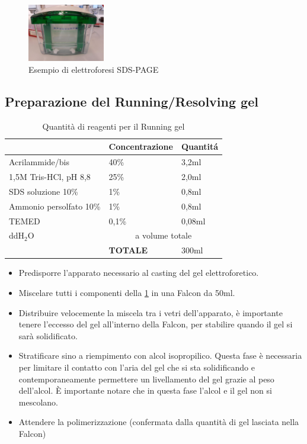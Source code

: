 \begin{figure}[H]
	\centering
	\includegraphics[width=0.3\textwidth]{./immagini/sds-page.jpg}
	\caption{Esempio di elettroforesi SDS-PAGE}
	\label{sds-page}
\end{figure}



\subsection{Preparazione del Running/Resolving gel}

\begin{table}
\begin{tabular}{|l|l|l|} \hline
	& \textbf{Concentrazione} & \textbf{Quantit\'a} \\\hline
	Acrilammide/bis & 40\% & 3,2ml \\\hline
	1,5M Tris-HCl, pH 8,8 & 25\% & 2,0ml \\\hline
	SDS soluzione 10\% & 1\% & 0,8ml \\\hline
	Ammonio persolfato 10\% & 1\% & 0,8ml \\\hline
	TEMED & 0,1\% & 0,08ml \\\hline
	ddH$_2$O & \multicolumn{2}{c|}{a volume totale} \\\hline

	& \textbf{TOTALE} & 300ml \\\hline
\end{tabular}
\caption{Quantit\`a di reagenti per il Running gel}
\label{table:running-gel}
\end{table}


\begin{itemize}
	\item Predisporre l'apparato necessario al casting del gel elettroforetico.

	\item Miscelare tutti i componenti della \ref{table:running-gel} in una Falcon da 50ml.

	\item Distribuire velocemente la miscela tra i vetri dell'apparato, \`e importante
	tenere l'eccesso del gel all'interno della Falcon, per stabilire quando il gel
	si sar\`a solidificato.

	\item Stratificare sino a riempimento con alcol isopropilico.
	Questa fase \`e necessaria per limitare il contatto con l'aria
	del gel che si sta solidificando e contemporaneamente	permettere
	un livellamento del gel grazie al peso dell'alcol.
	\`E importante notare che in questa fase l'alcol e
	il gel non si mescolano.

	\item Attendere la polimerizzazione (confermata dalla quantit\`a di
	gel lasciata nella Falcon)
\end{itemize}

